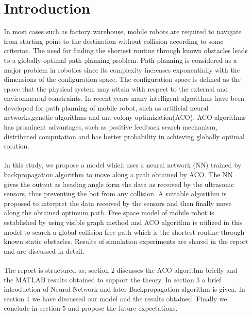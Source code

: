 \documentclass[a4paper, 12pt]{article}
\begin{document}
\section{Introduction}
In most cases such as factory warehouse, mobile robots are required to navigate from starting point to the destination without collision according to some criterion. The need for finding the shortest routine through known obstacles leads to a globally optimal path planning problem. Path planning is considered as a major problem in robotics since its complexity increases exponentially with the dimensions of the configuration space. The configuration space is defined as the space that the physical system may attain with respect to the external and environmental constraints. In recent years many intelligent algorithms have been developed for path planning of mobile robot, such as artificial neural networks,genetic algorithms and ant colony optimization(ACO). ACO algorithms has prominent advantages, such as positive feedback search mechanism, distributed computation and has better probability in achieving globally optimal solution. \\
\\
In this study, we propose a model which uses a neural network (NN) trained by backpropagation algorithm\cite{refer2} to move along a path obtained by ACO. The NN gives the output as heading angle form the data as received by the ultrasonic sensors, thus preventing the bot from any collision. A suitable algorithm is proposed to interpret the data received by the sensors and then finally move along the obtained optimum path. Free space model of mobile robot is established by using visible graph method and ACO algorithm is utilized in this model to search a global collision free path which is the shortest routine through known static obstacles. Results of simulation experiments are shared in the report and are discussed in detail.\\
\\ 
The report is structured as; section 2 discusses the ACO algorithm briefly and the MATLAB results obtained to support the theory. In section 3 a brief introduction of Neural Network and later Backpropagation algorithm is given. In section 4 we have discussed our model and the results obtained. Finally we conclude in section 5 and propose the future expectations.
\end{document}
